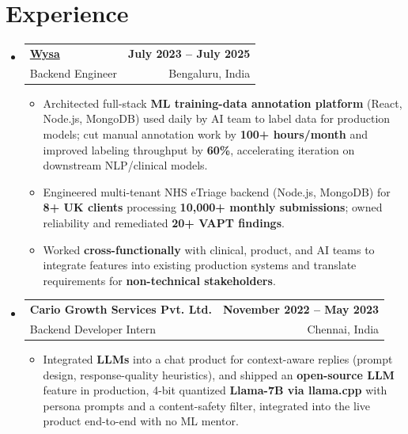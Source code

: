 \documentclass[letterpaper,10pt]{article}
\makeatletter
\newcommand{\resumeItem}[1]{
  \item\small{#1\vspace{-1pt}}
}
\newcommand{\resumeSubheading}[4]{
  \vspace{1pt}\item
    \begin{tabular*}{0.985\textwidth}[t]{l@{\extracolsep{\fill}}r}
      \textbf{#1} & \textbf{\small #2} \\
      {\small\color{ResumeSlate} #3} & {\small\color{ResumeSlate} #4} \\
    \end{tabular*}\vspace{-6pt}
}
\newcommand{\resumeSubHeadingListStart}{\begin{itemize}[leftmargin=0.0in, label={}, itemsep=2pt, topsep=2pt]}
\newcommand{\resumeSubHeadingListEnd}{\end{itemize}}
\newcommand{\resumeItemListStart}{\begin{itemize}[leftmargin=0.18in, itemsep=2pt, topsep=1pt]}
\newcommand{\resumeItemListEnd}{\end{itemize}\vspace{-4pt}}
\makeatother
\begin{document}
\section{Experience}
\resumeSubHeadingListStart
  \resumeSubheading
    {\href{https://www.wysa.io}{Wysa}}{July 2023 -- July 2025}
    {Backend Engineer}{Bengaluru, India}
    \resumeItemListStart
      \resumeItem{Architected full-stack \textbf{ML training-data annotation platform} (React, Node.js, MongoDB) used daily by AI team to label data for production models; cut manual annotation work by \textbf{100+ hours/month} and improved labeling throughput by \textbf{60\%}, accelerating iteration on downstream NLP/clinical models.}
      \resumeItem{Engineered multi-tenant NHS eTriage backend (Node.js, MongoDB) for \textbf{8+ UK clients} processing \textbf{10{,}000+ monthly submissions}; owned reliability and remediated \textbf{20+ VAPT findings}.}
      \resumeItem{Worked \textbf{cross-functionally} with clinical, product, and AI teams to integrate features into existing production systems and translate requirements for \textbf{non-technical stakeholders}.}
    \resumeItemListEnd
  \resumeSubheading
    {Cario Growth Services Pvt. Ltd.}{November 2022 -- May 2023}
    {Backend Developer Intern}{Chennai, India}
    \resumeItemListStart
      \resumeItem{Integrated \textbf{LLMs} into a chat product for context-aware replies (prompt design, response-quality heuristics), and shipped an \textbf{open-source LLM} feature in production, 4-bit quantized \textbf{Llama-7B via llama.cpp} with persona prompts and a content-safety filter, integrated into the live product end-to-end with no ML mentor.}
    \resumeItemListEnd
\resumeSubHeadingListEnd
\vspace{-4pt}
\end{document}
